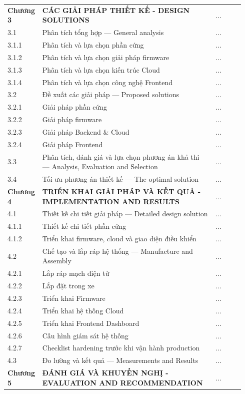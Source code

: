 \documentclass[13pt,a4paper]{extarticle}
\newcommand{\thesislongtableorignewline}{}
\let\thesislongtableorignewline\\
\renewcommand{\\}{\thesislongtableorignewline\hline}%
\let\\\thesislongtableorignewline
\begin{document}
{\begin{longtable}{|C{0.10\linewidth}|L{0.72\linewidth}|C{0.12\linewidth}|}
\textbf{Chương 3} & \textbf{CÁC GIẢI PHÁP THIẾT KẾ - DESIGN SOLUTIONS} &
... \\
3.1 & Phân tích tổng hợp --- General analysis & ... \\
3.1.1 & Phân tích và lựa chọn phần cứng & ... \\
3.1.2 & Phân tích và lựa chọn giải pháp firmware & ... \\
3.1.3 & Phân tích và lựa chọn kiến trúc Cloud & ... \\
3.1.4 & Phân tích và lựa chọn công nghệ Frontend & ... \\
3.2 & Đề xuất các giải pháp --- Proposed solutions & ... \\
3.2.1 & Giải pháp phần cứng & ... \\
3.2.2 & Giải pháp firmware & ... \\
3.2.3 & Giải pháp Backend \& Cloud & ... \\
3.2.4 & Giải pháp Frontend & ... \\
3.3 & Phân tích, đánh giá và lựa chọn phương án khả thi --- Analysis,
Evaluation and Selection & ... \\
3.4 & Tối ưu phương án thiết kế --- The optimal solution & ... \\
\textbf{Chương 4} & \textbf{TRIỂN KHAI GIẢI PHÁP VÀ KẾT QUẢ -
IMPLEMENTATION AND RESULTS} & ... \\
4.1 & Thiết kế chi tiết giải pháp --- Detailed design solution & ... \\
4.1.1 & Thiết kế chi tiết phần cứng & ... \\
4.1.2 & Triển khai firmware, cloud và giao diện điều khiển & ... \\
4.2 & Chế tạo và lắp ráp hệ thống --- Manufacture and Assembly & ... \\
4.2.1 & Lắp ráp mạch điện tử & ... \\
4.2.2 & Lắp đặt trong xe & ... \\
4.2.3 & Triển khai Firmware & ... \\
4.2.4 & Triển khai hệ thống Cloud & ... \\
4.2.5 & Triển khai Frontend Dashboard & ... \\
4.2.6 & Cấu hình giám sát hệ thống & ... \\
4.2.7 & Checklist hardening trước khi vận hành production & ... \\
4.3 & Đo lường và kết quả --- Measurements and Results & ... \\
\textbf{Chương 5} & \textbf{ĐÁNH GIÁ VÀ KHUYẾN NGHỊ - EVALUATION AND
RECOMMENDATION} & ... \\

\end{longtable}}
\end{document}

